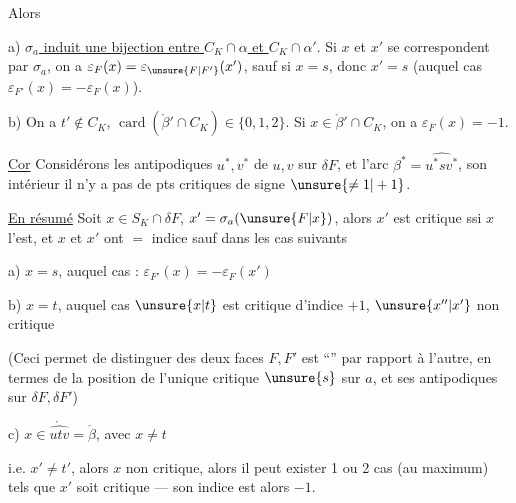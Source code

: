 Alors

a)  \uline{\(\sigma_a\) induit une bijection entre \(C_K\cap\alpha\) et \(C_K\cap\alpha'\)}.
Si \(x\) et \(x'\) se correspondent par \(\sigma_a\), on a \(\varepsilon_F(x)=\varepsilon_{\unsure{F|F'}}(x')\), sauf si \(x=s\), donc \(x'=s\) (auquel cas \(\varepsilon_{F'}(x)=-\varepsilon_F(x)\)).

b) On a \(t'\notin C_K\),  \(\operatorname{card}(\mathring{\beta}'\cap C_K)\)\(\in\{0,1,2\}\).
 Si \(x\in\mathring{\beta}'\cap C_K\), on a \(\varepsilon_F(x)=-1\).

\uline{Cor} Considérons les antipodiques \(u^*,v^*\) de \(u,v\) sur \(\delta F\), et l'arc \(\beta^*=\widehat{u^*sv^*}\),   son intérieur il n'y a pas de pts critiques de signe \(\unsure{\ne1|+1}\).

\uline{En résumé} Soit \(x\in S_K\cap\delta F\),  \(x'=\sigma_a(\unsure{F|x})\), alors \(x'\) est critique ssi \(x\) l'est, et \(x\) et \(x'\) ont $=$ indice sauf dans les cas suivants

a) \(x=s\), auquel cas : \(\varepsilon_{F'}(x)=-\varepsilon_F(x')\)

b) \(x=t\), auquel cas  \(\unsure{x|t}\) est critique d'indice \(+1\), \(\unsure{x''|x'}\) non critique

(Ceci permet de distinguer  des deux faces \(F,F'\) est ``'' par rapport à l'autre, en termes de la position de l'unique critique \(\unsure{s}\) sur \(a\), et ses  antipodiques sur \(\delta F,\delta F'\))

c) \(x\in\mathring{\widehat{utv}}=\mathring{\beta}\), avec \(x\ne t\)

i.e. \(x'\ne t'\), alors \(x\) non critique, alors il peut exister 1 ou 2 cas (au maximum) tels que \(x'\) soit critique --- son indice est alors \(-1\).
